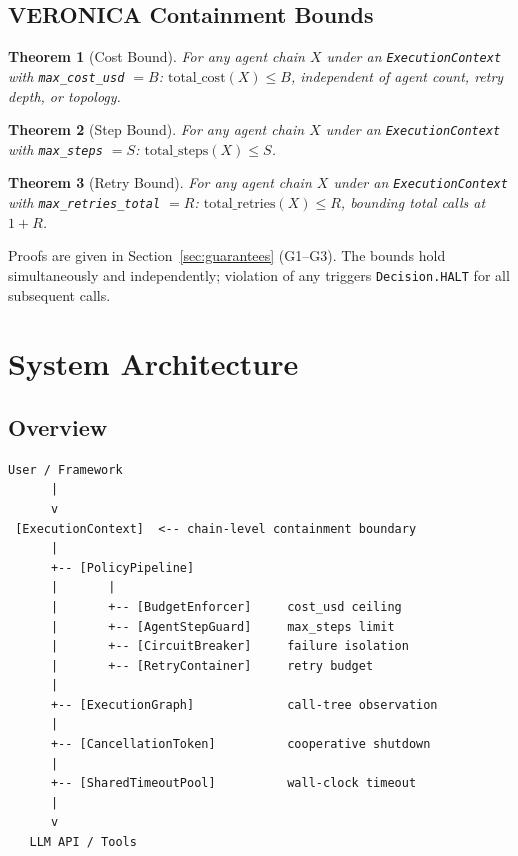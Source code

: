 \documentclass[11pt]{article}
\newtheorem{theorem}{Theorem}
\begin{document}
\subsection{VERONICA Containment Bounds}

\begin{theorem}[Cost Bound]
For any agent chain $X$ under an \texttt{ExecutionContext} with
\texttt{max\_cost\_usd} $= B$: $\text{total\_cost}(X) \leq B$, independent
of agent count, retry depth, or topology.
\end{theorem}

\begin{theorem}[Step Bound]
For any agent chain $X$ under an \texttt{ExecutionContext} with
\texttt{max\_steps} $= S$: $\text{total\_steps}(X) \leq S$.
\end{theorem}

\begin{theorem}[Retry Bound]
For any agent chain $X$ under an \texttt{ExecutionContext} with
\texttt{max\_retries\_total} $= R$: $\text{total\_retries}(X) \leq R$,
bounding total calls at $1 + R$.
\end{theorem}

Proofs are given in Section~\ref{sec:guarantees} (G1--G3). The bounds hold
simultaneously and independently; violation of any triggers
\texttt{Decision.HALT} for all subsequent calls.

\section{System Architecture}
\label{sec:architecture}

\subsection{Overview}

\begin{verbatim}
User / Framework
      |
      v
 [ExecutionContext]  <-- chain-level containment boundary
      |
      +-- [PolicyPipeline]
      |       |
      |       +-- [BudgetEnforcer]     cost_usd ceiling
      |       +-- [AgentStepGuard]     max_steps limit
      |       +-- [CircuitBreaker]     failure isolation
      |       +-- [RetryContainer]     retry budget
      |
      +-- [ExecutionGraph]             call-tree observation
      |
      +-- [CancellationToken]          cooperative shutdown
      |
      +-- [SharedTimeoutPool]          wall-clock timeout
      |
      v
   LLM API / Tools
\end{verbatim}
\end{document}

